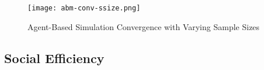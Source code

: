 \begin{figure}[ht] 
    \centering
    \caption{Agent-Based Simulation Convergence with Varying Sample Sizes}
    \texttt{[image: abm-conv-ssize.png]}
    \label{fig:abm-conv-ssize}
\end{figure}

\begin{comment}
\begin{itemize}
    \item Check Mass convergence
    \item Check distribution convergence
    \item Relate to ESS
    \item What about Dynamics??? BR
\end{itemize} 
\end{comment}
\subsection{Social Efficiency}


